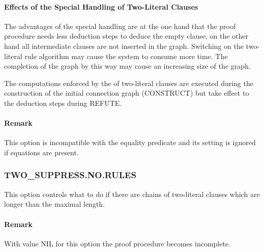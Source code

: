 \PO


\paragraph{Effects of the Special Handling of Two-Literal Clauses}

The advantages of the special handling are at the one hand that the proof 
procedure needs less deduction steps to deduce the empty clause, on the 
other hand all intermediate clauses are not inserted 
in the graph.
Switching on the two-literal rule algorithm may  cause the system to 
consume more time. The completion of the graph by this way may cause an
increasing size of the graph. 

The computations enforced by the of two-literal clauses are
executed during the construction of the initial connection graph
(CONSTRUCT) but take effect to the deduction steps during REFUTE.

\paragraph{Remark}
This option is incompatible with the equality predicate and its setting is 
ignored if equations are present.

\subsubsection{TWO\_SUPPRESS.NO.RULES}
 

This option controls what to do if there 
are chains of two-literal clauses which are longer  than the maximal 
length. 

\PO
{}

\paragraph{Remark}
With value NIL for this option the proof procedure becomes incomplete. 

